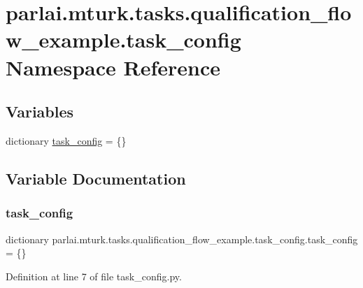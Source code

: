 \hypertarget{namespaceparlai_1_1mturk_1_1tasks_1_1qualification__flow__example_1_1task__config}{}\section{parlai.\+mturk.\+tasks.\+qualification\+\_\+flow\+\_\+example.\+task\+\_\+config Namespace Reference}
\label{namespaceparlai_1_1mturk_1_1tasks_1_1qualification__flow__example_1_1task__config}
\subsection*{Variables}
\begin{DoxyCompactItemize}
\item 
dictionary \hyperlink{namespaceparlai_1_1mturk_1_1tasks_1_1qualification__flow__example_1_1task__config_ad3f79216895422b8009b4f92c7c4e332}{task\+\_\+config} = \{\}
\end{DoxyCompactItemize}


\subsection{Variable Documentation}
\mbox{\label{namespaceparlai_1_1mturk_1_1tasks_1_1qualification__flow__example_1_1task__config_ad3f79216895422b8009b4f92c7c4e332}} 
\subsubsection{\texorpdfstring{task\+\_\+config}{task\_config}}
{\footnotesize\ttfamily dictionary parlai.\+mturk.\+tasks.\+qualification\+\_\+flow\+\_\+example.\+task\+\_\+config.\+task\+\_\+config = \{\}}



Definition at line 7 of file task\+\_\+config.\+py.

